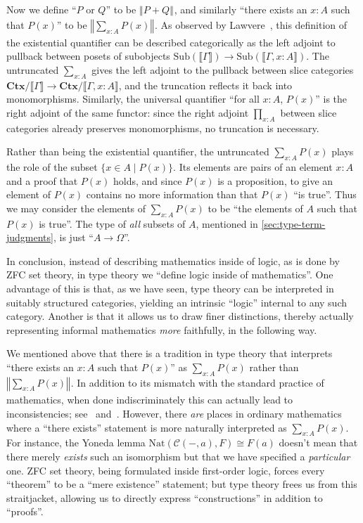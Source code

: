 \documentclass[12pt]{article}
\def\m#1{\llbracket#1\rrbracket}
\def\C{\mathscr{C}}
\def\Ctx{\mathbf{Ctx}}
\numberwithin{equation}{section}
\newcommand{\trunc}[2]{\mathopen{}\left\Vert #2\right\Vert_{#1}\mathclose{}}
\newcommand{\brck}[1]{\trunc{}{#1}}
\begin{document}
Now we define ``$P$ or $Q$'' to be $\brck{P+Q}$, and similarly ``there exists an $x:A$ such that $P(x)$'' to be $\brck{\sum_{x:A} P(x)}$.
As observed by Lawvere~\cite{lawvere:adjointness}, this definition of the existential quantifier can be described categorically as the left adjoint to pullback between posets of subobjects $\mathrm{Sub}(\m\Gamma) \to \mathrm{Sub}(\m{\Gamma,x:A})$.
The untruncated $\sum_{x:A}$ gives the left adjoint to the pullback between slice categories $\Ctx/\m\Gamma  \to \Ctx/\m{\Gamma,x:A}$, and the truncation reflects it back into monomorphisms.
Similarly, the universal quantifier ``for all $x:A$, $P(x)$'' is the right adjoint of the same functor: since the right adjoint $\prod_{x:A}$ between slice categories already preserves monomorphisms, no truncation is necessary.

Rather than being the existential quantifier, the untruncated $\sum_{x:A} P(x)$ plays the role of the subset $\{ x\in A \mid P(x) \}$.
Its elements are pairs of an element $x:A$ and a proof that $P(x)$ holds, and since $P(x)$ is a proposition, to give an element of $P(x)$ contains no more information than that $P(x)$ ``is true''.
Thus we may consider the elements of $\sum_{x:A} P(x)$ to be ``the elements of $A$ such that $P(x)$ is true''.
The type of \emph{all} subsets of $A$, mentioned in \cref{sec:type-term-judgments}, is just ``$A\to\Omega$''.

In conclusion, instead of describing mathematics inside of logic, as is done by ZFC set theory, in type theory we ``define logic inside of mathematics''.
One advantage of this is that, as we have seen, type theory can be interpreted in suitably structured categories, yielding an intrinsic ``logic'' internal to any such category.
Another is that it allows us to draw finer distinctions, thereby actually representing informal mathematics \emph{more} faithfully, in the following way.

We mentioned above that there is a tradition in type theory that interprets ``there exists an $x:A$ such that $P(x)$'' as $\sum_{x:A} P(x)$ rather than $\brck{\sum_{x:A} P(x)}$.
In addition to its mismatch with the standard practice of mathematics, when done indiscriminately this can actually lead to inconsistencies; see~\cite[\S3.2]{hottbook} and~\cite{escardo-xu:brouwer-ch}.
However, there \emph{are} places in ordinary mathematics where a ``there exists'' statement is more naturally interpreted as $\sum_{x:A} P(x)$.
For instance, the Yoneda lemma $\mathrm{Nat}(\C(-,a),F) \cong F(a)$ doesn't mean that there merely \emph{exists} such an isomorphism but that we have specified a \emph{particular} one.
ZFC set theory, being formulated inside first-order logic, forces every ``theorem'' to be a ``mere existence'' statement; but type theory frees us from this straitjacket, allowing us to directly express ``constructions'' in addition to ``proofs''.
\end{document}
